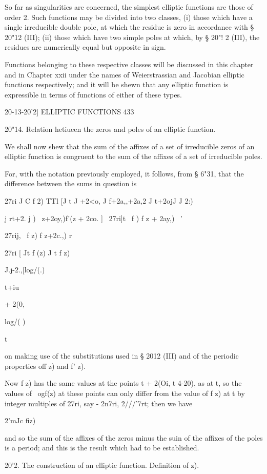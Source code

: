 So far as singularities are concerned, the simplest elliptic functions
are those of order 2. Such functions may be divided into two classes,
(i) those which have a single irreducible double pole, at which the
residue is zero in accordance with § 20"12 (III); (ii) those which
have two simple poles at which, by § 20"! 2 (III), the residues are
numerically equal but opposite in sign.

Functions belonging to these respective classes will be discussed in
this chapter and in Chapter xxii under the names of Weierstrassian and
Jacobian elliptic functions respectively; and it will be shewn that
any elliptic function is expressible in terms of functions of either
of these types.

20-13-20'2] ELLIPTIC FUNCTIONS 433

20"14. Relation hetiueen the zeros and poles of an elliptic function.

We shall now shew that the sum of the affixes of a set of irreducible
zeros of an elliptic function is congruent to the sum of the affixes
of a set of irreducible poles.

For, with the notation previously employed, it follows, from § 6"31,
that the difference between the sums in question is

27ri J C f 2) TTl [J t J +2<o, J f+2a,,+2a,2 J t+2ojJ J 2:)

  j rt+2. j ) \ z+2oy,)f'(z + 2co. ] ~27ri]t \ f ) f z + 2ay,) \ '

27rij, \ f z) f z+2c.,) r

27ri [ Jt f (z) J t f z)

J.j-2.,[log/(.)

t+iu

+ 2(0,

log/( )

t

on making use of the substitutions used in § 2012 (III) and of the
periodic properties off z) and f' z).

Now f z) has the same values at the points t + 2(Oi, t 4-20), as at t,
so the values of \ ogf(z) at these points can only differ from the
value of f z) at t by integer multiples of 27ri, say - 2n7ri,
2///'7rt; then we have

2'mJc fiz)

and so the sum of the affixes of the zeros minus the suin of the
affixes of the poles is a period; and this is the result which had to
be established.

20'2. The construction of an elliptic function. Definition of z).

